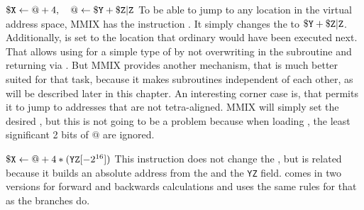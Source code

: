 \instrtbl
	{}
	{${\tt \$X} \leftarrow @+4,\quad @ \leftarrow {\tt \$Y} + {\tt \$Z}{\tt|Z}$}
\noindent To be able to jump to any location in the virtual address space, MMIX has the instruction . It simply changes the  to ${\tt \$Y} + {\tt \$Z}{\tt|Z}$. Additionally,  is set to the location that ordinary would have been executed next. That allows using  for a simple type of  by not overwriting  in the subroutine and returning via . But MMIX provides another mechanism, that is much better suited for that task, because it makes subroutines independent of each other, as will be described later in this chapter. An interesting corner case is, that  permits it to jump to addresses that are not tetra-aligned. MMIX will simply set the desired , but this is not going to be a problem because when loading , the least significant 2 bits of $@$ are ignored. \citep[pg. 13]{mmix-doc}

\instrtbl
	{}
	{${\tt \$X} \leftarrow @+4*({\tt YZ}[-2^{16}])$}
\noindent This instruction does not change the , but is related because it builds an absolute address from the  and the {\tt YZ} field.  comes in two versions for forward and backwards calculations and uses the same rules for that as the branches do. \citep[pg. 13]{mmix-doc}

